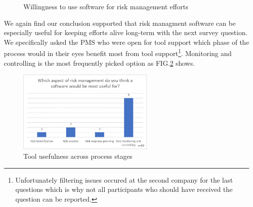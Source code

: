 \begin{figure}[H]
	\centering
	\caption{Willingness to use software for risk management efforts}
	\label{fig:label24}
\end{figure}

We again find our conclusion supported that risk managment software can be especially useful for keeping efforts alive long-term with the next survey question. We specifically asked the PMS who were open for tool support which phase of the process would in their eyes benefit most from tool support\footnote{Unfortunately filtering issues occured at the second company for the last questions which is why not all participants who should have received the question can be reported.}. Monitoring and controlling is the most frequently picked option as FIG.\ref{fig:label25} shows. 

\begin{figure}[H]
	\centering
	\includegraphics[width=0.6\textwidth]{Assets/survey_results/Q8.png}
	\caption{Tool usefulness across process stages}
	\label{fig:label25}
\end{figure}


